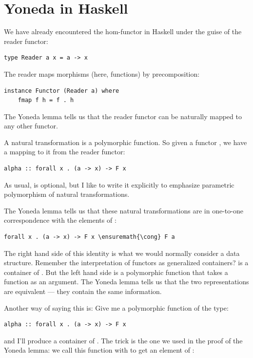 \section{Yoneda in Haskell}\label{yoneda-in-haskell}

We have already encountered the hom-functor in Haskell under the guise
of the reader functor:

\begin{Verbatim}[commandchars=\\\{\}]
type Reader a x = a -> x
\end{Verbatim}
The reader maps morphisms (here, functions) by precomposition:

\begin{Verbatim}[commandchars=\\\{\}]
instance Functor (Reader a) where
    fmap f h = f . h
\end{Verbatim}
The Yoneda lemma tells us that the reader functor can be naturally
mapped to any other functor.

A natural transformation is a polymorphic function. So given a functor
, we have a mapping to it from the reader functor:

\begin{Verbatim}[commandchars=\\\{\}]
alpha :: forall x . (a -> x) -> F x
\end{Verbatim}
As usual,  is optional, but I like to write it explicitly
to emphasize parametric polymorphism of natural transformations.

The Yoneda lemma tells us that these natural transformations are in
one-to-one correspondence with the elements of :

\begin{Verbatim}[commandchars=\\\{\}]
forall x . (a -> x) -> F x \ensuremath{\cong} F a
\end{Verbatim}
The right hand side of this identity is what we would normally consider
a data structure. Remember the interpretation of functors as generalized
containers?  is a container of . But the left
hand side is a polymorphic function that takes a function as an
argument. The Yoneda lemma tells us that the two representations are
equivalent --- they contain the same information.

Another way of saying this is: Give me a polymorphic function of the
type:

\begin{Verbatim}[commandchars=\\\{\}]
alpha :: forall x . (a -> x) -> F x
\end{Verbatim}
and I'll produce a container of . The trick is the one we used
in the proof of the Yoneda lemma: we call this function with 
to get an element of :

